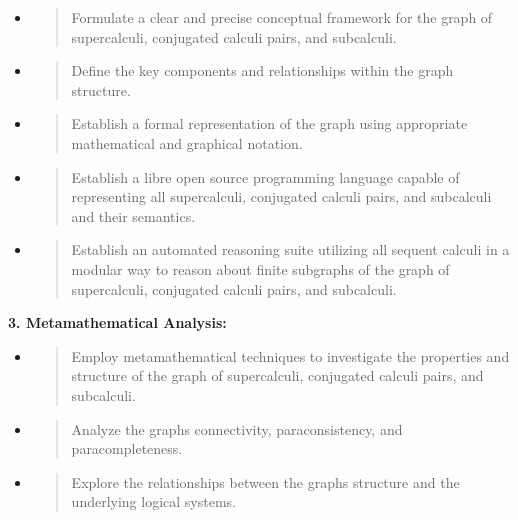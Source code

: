 \begin{itemize}
\item
  \begin{quote}
  Formulate a clear and precise conceptual framework for the graph of
  supercalculi, conjugated calculi pairs, and subcalculi.
  \end{quote}
\item
  \begin{quote}
  Define the key components and relationships within the graph
  structure.
  \end{quote}
\item
  \begin{quote}
  Establish a formal representation of the graph using appropriate
  mathematical and graphical notation.
  \end{quote}
\item
  \begin{quote}
  Establish a libre open source programming language capable of
  representing all supercalculi, conjugated calculi pairs, and
  subcalculi and their semantics.
  \end{quote}
\item
  \begin{quote}
  Establish an automated reasoning suite utilizing all sequent calculi
  in a modular way to reason about finite subgraphs of the graph of
  supercalculi, conjugated calculi pairs, and subcalculi.
  \end{quote}
\end{itemize}

\textbf{3. Metamathematical Analysis:}

\begin{itemize}
\item
  \begin{quote}
  Employ metamathematical techniques to investigate the properties and
  structure of the graph of supercalculi, conjugated calculi pairs, and
  subcalculi.
  \end{quote}
\item
  \begin{quote}
  Analyze the graph\textquotesingle s connectivity, paraconsistency, and
  paracompleteness.
  \end{quote}
\item
  \begin{quote}
  Explore the relationships between the graph\textquotesingle s
  structure and the underlying logical systems.
  \end{quote}
\end{itemize}

